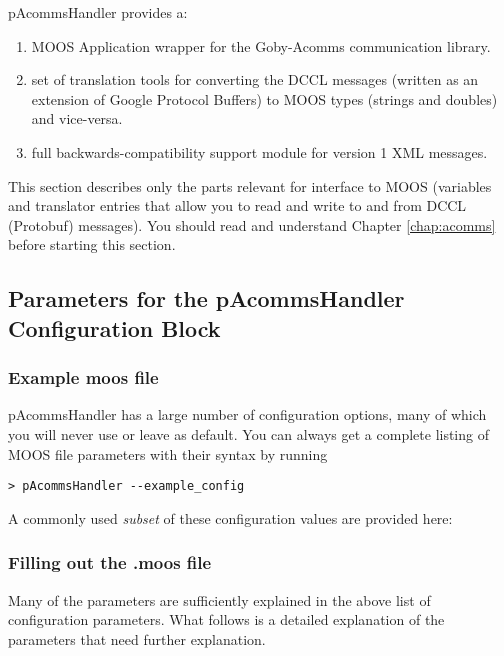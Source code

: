 pAcommsHandler provides a:
\begin{enumerate}
\item MOOS Application wrapper for the Goby-Acomms communication library.
\item set of translation tools for converting the DCCL messages (written as an extension of Google Protocol Buffers) to MOOS types (strings and doubles) and vice-versa.
\item full backwards-compatibility support module for version 1 XML messages. 
\end{enumerate}

This section describes only the parts relevant for interface to MOOS (variables and translator entries that allow you to read and write to and from DCCL (Protobuf) messages). You should read and understand Chapter \ref{chap:acomms} before starting this section.

\subsection{Parameters for the pAcommsHandler Configuration Block}\label{sec:pAcommsHandler:config}

\subsubsection{Example moos file}

pAcommsHandler has a large number of configuration options, many of which you will never use or leave as default. You can always get a complete listing of MOOS file parameters with their syntax by running
\begin{verbatim}
> pAcommsHandler --example_config
\end{verbatim}
\resetbvlinenumber

A commonly used \textit{subset} of these configuration values are provided here:

\resetbvlinenumber


\subsubsection{Filling out the .moos file}\label{sec:pAcommsHandler_moos_file}

Many of the parameters are sufficiently explained in the above list of configuration parameters. What follows is a detailed explanation of the parameters that need further explanation.

